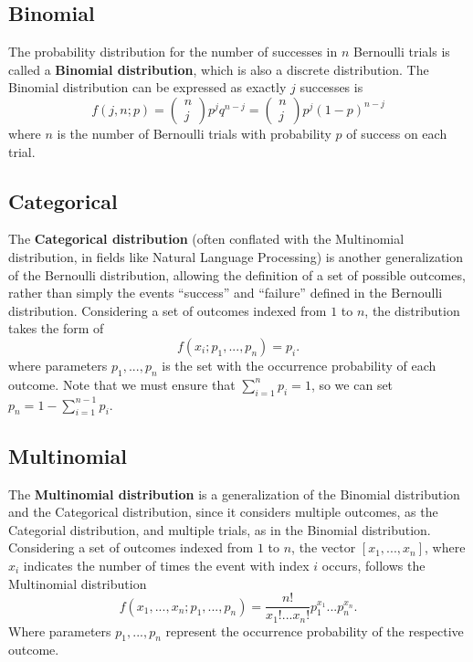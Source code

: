 \subsection{\label{binomial} Binomial}
The probability distribution for the number of successes in $n$ Bernoulli trials is called a {\bf Binomial distribution}, which is also a discrete distribution. The Binomial distribution can be expressed as 
exactly $j$ successes is 
\begin{equation*}
f(j,n;p)= \left(\begin{array}{c}
n \\
j \end{array}\right) p^{j}q^{n-j} = \left(\begin{array}{c}
n \\
j \end{array}\right) p^{j}(1-p)^{n-j}
\end{equation*}
where $n$ is the number of Bernoulli trials with probability $p$ of success on each trial.

\subsection{\label{categorical} Categorical}
The \textbf{Categorical distribution} (often conflated with the Multinomial distribution, in fields like Natural Language Processing) is another generalization of the Bernoulli distribution, allowing the definition of a set of possible outcomes, rather than simply the events ``success'' and ``failure'' defined in the Bernoulli distribution. Considering a set of outcomes indexed from $1$ to $n$, the distribution takes the form of
\begin{equation*}
f(x_i;p_1,...,p_n) = p_i.
\end{equation*}
where parameters $p_1,...,p_n$ is the set with the occurrence probability of each outcome. Note that we must ensure that $\sum_{i=1}^np_i=1$, so we can set $p_n = 1 - \sum_{i=1}^{n-1}p_i$.

\subsection{\label{multinomial} Multinomial}

The \textbf{Multinomial distribution} is a generalization of the Binomial distribution and the Categorical distribution, since it considers multiple outcomes, as the Categorial distribution, and multiple trials, as in the Binomial distribution.
Considering a set of outcomes indexed from $1$ to $n$, the vector $[x_1, ..., x_n]$, where $x_i$ indicates the number of times the event with index $i$ occurs, follows the Multinomial distribution
\begin{equation*}
f(x_1,...,x_n;p_1,...,p_n) = \frac{n!}{x_{1}!...x_{n}!} p_{1}^{x_{1}}...p_{n}^{x_{n}}.
\end{equation*}
Where parameters $p_1,...,p_n$ represent the occurrence probability of the respective outcome.


